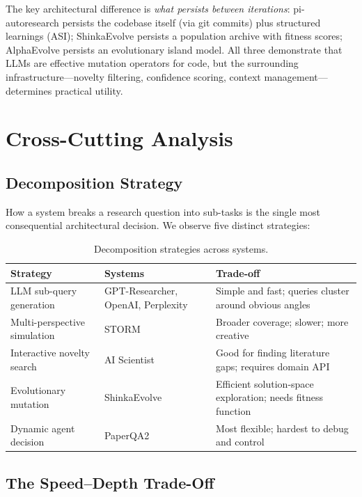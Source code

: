 \documentclass[11pt,a4paper]{article}
\begin{document}
The key architectural difference is \emph{what persists between
iterations}: pi-autoresearch persists the codebase itself (via git
commits) plus structured learnings (ASI); ShinkaEvolve persists a
population archive with fitness scores; AlphaEvolve persists an
evolutionary island model. All three demonstrate that LLMs are
effective mutation operators for code, but the surrounding
infrastructure---novelty filtering, confidence scoring, context
management---determines practical utility.

\section{Cross-Cutting Analysis}
\label{sec:cross}

\subsection{Decomposition Strategy}

How a system breaks a research question into sub-tasks is the single
most consequential architectural decision. We observe five distinct
strategies:

\begin{table}[h]
\centering
\small
\begin{tabular}{@{}L{3.5cm}L{3.5cm}L{6cm}@{}}
\toprule
\textbf{Strategy} & \textbf{Systems} & \textbf{Trade-off} \\
\midrule
LLM sub-query generation & GPT-Researcher, OpenAI, Perplexity &
  Simple and fast; queries cluster around obvious angles \\[0.3em]
Multi-perspective simulation & STORM &
  Broader coverage; slower; more creative \\[0.3em]
Interactive novelty search & AI Scientist &
  Good for finding literature gaps; requires domain API \\[0.3em]
Evolutionary mutation & ShinkaEvolve &
  Efficient solution-space exploration; needs fitness function \\[0.3em]
Dynamic agent decision & PaperQA2 &
  Most flexible; hardest to debug and control \\
\bottomrule
\end{tabular}
\caption{Decomposition strategies across systems.}
\label{tab:decomposition}
\end{table}

\subsection{The Speed--Depth Trade-Off}
\end{document}
